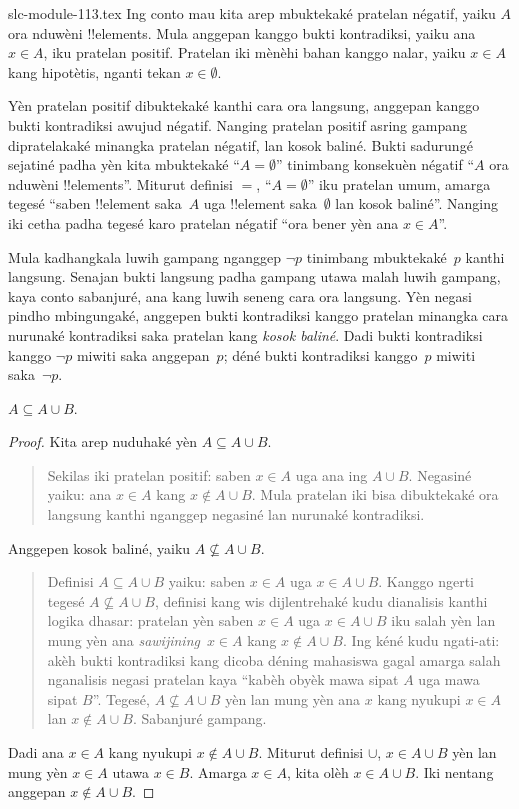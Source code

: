 \begin{filecontents*}[overwrite]{slc-module-113.tex}
Ing conto mau kita arep mbuktekaké pratelan négatif,
yaiku $A$ ora nduwèni !!{element}s. Mula anggepan
kanggo bukti kontradiksi, yaiku ana $x \in A$,
iku pratelan positif. Pratelan iki mènèhi bahan
kanggo nalar, yaiku $x \in A$ kang hipotètis,
nganti tekan $x \in \emptyset$.

Yèn pratelan positif dibuktekaké kanthi cara ora
langsung, anggepan kanggo bukti kontradiksi
awujud négatif. Nanging pratelan positif asring
gampang dipratelakaké minangka pratelan négatif,
lan kosok baliné. Bukti sadurungé sejatiné
padha yèn kita mbuktekaké ``$A = \emptyset$''
tinimbang konsekuèn négatif ``$A$ ora nduwèni
!!{element}s''. Miturut definisi $=$,
``$A = \emptyset$'' iku pratelan umum, amarga
tegesé ``saben !!{element} saka~$A$ uga
!!{element} saka~$\emptyset$ lan kosok baliné''.
Nanging iki cetha padha tegesé karo pratelan
négatif ``ora bener yèn ana $x \in A$''.

Mula kadhangkala luwih gampang nganggep $\lnot p$
tinimbang mbuktekaké~$p$ kanthi langsung.
Senajan bukti langsung padha gampang utawa
malah luwih gampang, kaya conto sabanjuré,
ana kang luwih seneng cara ora langsung.
Yèn negasi pindho mbingungaké, anggepen bukti
kontradiksi kanggo pratelan minangka cara
nurunaké kontradiksi saka pratelan kang
\emph{kosok baliné}. Dadi bukti kontradiksi
kanggo $\lnot p$ miwiti saka anggepan~$p$;
déné bukti kontradiksi kanggo~$p$ miwiti
saka~$\lnot p$.

\begin{prop}
$A \subseteq A \cup B$.
\end{prop}

\begin{proof}
  Kita arep nuduhaké yèn $A \subseteq A \cup B$.
  \begin{quote}
    Sekilas iki pratelan positif: saben $x \in A$
    uga ana ing $A \cup B$. Negasiné yaiku:
    ana $x \in A$ kang $x \notin A \cup B$.
    Mula pratelan iki bisa dibuktekaké ora langsung
    kanthi nganggep negasiné lan nurunaké
    kontradiksi.
  \end{quote}
  Anggepen kosok baliné, yaiku
  $A \nsubseteq A \cup B$.
  \begin{quote}
    Definisi $A \subseteq A \cup B$ yaiku:
    saben $x \in A$ uga $x \in A \cup B$.
    Kanggo ngerti tegesé $A \nsubseteq A \cup B$,
    definisi kang wis dijlentrehaké kudu
    dianalisis kanthi logika dhasar: pratelan
    yèn saben $x \in A$ uga $x \in
    A \cup B$ iku salah yèn lan mung yèn ana
    \emph{sawijining}~$x \in A$ kang
    $x \notin A \cup B$.
    Ing kéné kudu ngati-ati: akèh bukti kontradiksi
    kang dicoba déning mahasiswa gagal amarga
    salah nganalisis negasi pratelan kaya
    ``kabèh obyèk mawa sipat $A$ uga mawa sipat $B$''. Tegesé,
    $A \nsubseteq A \cup B$ yèn lan mung yèn
    ana $x$ kang nyukupi $x \in A$ lan
    $x \notin A \cup B$. Sabanjuré gampang.
  \end{quote}
  Dadi ana $x \in A$ kang nyukupi
  $x \notin A \cup B$. Miturut definisi
  $\cup$, $x \in A \cup B$ yèn lan mung yèn
  $x \in A$ utawa $x \in
  B$. Amarga $x \in A$, kita olèh
  $x \in A \cup B$. Iki nentang anggepan
  $x \notin A \cup B$.
\end{proof}


\end{filecontents*}
